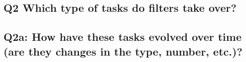 \begin{comment}
maybe it's a historical phenomenon (in many regards):
* perhaps there were differences that are not essential anymore, such as:
  * on which infrastructure does it run (part of the core software vs own computers of the bot operators)
  * filters are triggered *before* an edit is even published, whereas bots (and tools) can revert an edit post factum. Is this really an important difference in times when bots need a couple of seconds to revert an edit?
* perhaps the extension was implemented because someone was capable of implementing and working well with this type of systems so they just went and did it (do-ocracy; Wikipedia as a collaborative volunteer project);
* perhaps it still exists in times of fancier machine learning based tools (or bots) because rule-based systems are more transparent/easily understandable for humans and writing a regex is simpler than coding a bot.
* hypothesis: it is easier to set up a filter than program a bot. Setting up a filter requires "only" understanding of regular expressions. Programming a bot requires knowledge of a programming language and understanding of the API.
\end{comment}

\subsection{Q2 Which type of tasks do filters take over?}

\subsection{Q2a: How have these tasks evolved over time (are they changes in the type, number, etc.)?}




\begin{comment}
Alternative approaches to community management:
compare with Surviving the Eternal September paper~\cite{KieMonHill2016}
"importance of strong
systems of norm enforcement made possible by leadership,
community engagement, and technology."

"emphasizing decentralized moderation" //all community members help enforce the norms
"ensuring enough leadership capacity is available
when an influx of newcomers is anticipated."
"Designers may
benefit by focusing on tools to let existing leaders bring others
on board and help them clearly communicate norms."
"designers should support an ecosystem of accessible and ap-
propriate moderator tools."

\end{comment}

